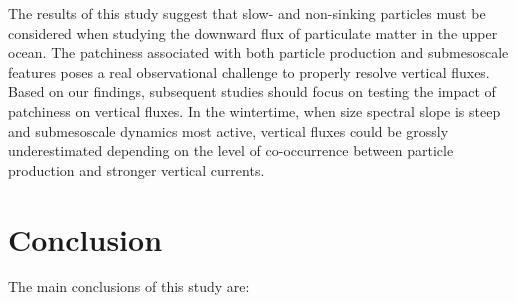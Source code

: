 \documentclass[article,linenumbers]{agujournal2019}
\begin{document}
	The results of this study suggest that slow- and non-sinking particles must be considered when studying the downward flux of particulate matter in the upper ocean. The patchiness associated with both particle production and submesoscale features poses a real observational challenge to properly resolve vertical fluxes. Based on our findings, subsequent studies should focus on testing the impact of patchiness on vertical fluxes. In the wintertime, when size spectral slope is steep and submesoscale dynamics most active, vertical fluxes could be grossly underestimated depending on the level of co-occurrence between particle production and stronger vertical currents.

	\section{Conclusion}
	\label{sec: Conclusions}
	The main conclusions of this study are:
\end{document}

